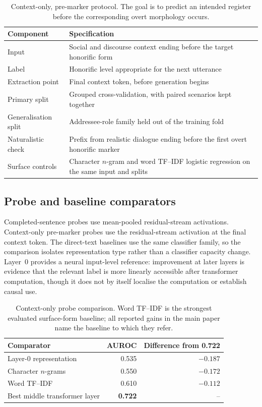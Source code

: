 \documentclass[10pt]{article}
\begin{document}
\begin{table}[H]
\centering
\small
\setlength\tabcolsep{5pt}
\renewcommand{\arraystretch}{1.10}
\begin{tabularx}{\textwidth}{>{\raggedright\arraybackslash}X >{\raggedright\arraybackslash}X}
\toprule
\textbf{Component} & \textbf{Specification} \\
\midrule
Input & Social and discourse context ending before the target honorific form \\
Label & Honorific level appropriate for the next utterance \\
Extraction point & Final context token, before generation begins \\
Primary split & Grouped cross-validation, with paired scenarios kept together \\
Generalisation split & Addressee-role family held out of the training fold \\
Naturalistic check & Prefix from realistic dialogue ending before the first overt honorific marker \\
Surface controls & Character $n$-gram and word TF--IDF logistic regression on the same input and splits \\
\bottomrule
\end{tabularx}
\caption{Context-only, pre-marker protocol. The goal is to predict an intended
register before the corresponding overt morphology occurs.}
\label{tab:context-protocol}
\end{table}

\subsection{Probe and baseline comparators}

Completed-sentence probes use mean-pooled residual-stream activations.
Context-only pre-marker probes use the residual-stream activation at the final
context token. The direct-text baselines use the same classifier family, so the
comparison isolates representation type rather than a classifier capacity
change. Layer~0 provides a neural input-level reference: improvement at later
layers is evidence that the relevant label is more linearly accessible after
transformer computation, though it does not by itself localise the computation
or establish causal use.

\begin{table}[H]
\centering
\small
\begin{tabular}{lrr}
\toprule
\textbf{Comparator} & \textbf{AUROC} & \textbf{Difference from 0.722} \\
\midrule
Layer-0 representation & 0.535 & $-0.187$ \\
Character $n$-grams & 0.550 & $-0.172$ \\
Word TF--IDF & 0.610 & $-0.112$ \\
Best middle transformer layer & \textbf{0.722} & -- \\
\bottomrule
\end{tabular}
\caption{Context-only probe comparison. Word TF--IDF is the strongest evaluated
surface-form baseline; all reported gains in the main paper name the baseline
to which they refer.}
\label{tab:baseline-comparison}
\end{table}
\end{document}
